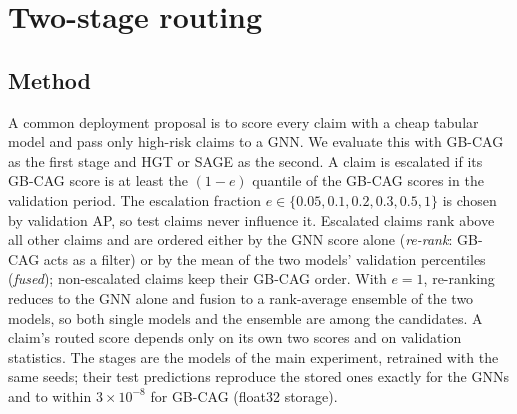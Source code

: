 \documentclass[pdflatex,sn-vancouver-num]{sn-jnl}
\begin{document}
\section{Two-stage routing}\label{sec:s_routing}

\subsection{Method}\label{sec:s_routing_method}
A common deployment proposal is to score every claim with a cheap tabular
model and pass only high-risk claims to a GNN. We evaluate this with GB-CAG
as the first stage and HGT or SAGE as the second. A claim is escalated if its
GB-CAG score is at least the $(1-e)$ quantile of the GB-CAG scores in the
validation period. The escalation fraction $e\in\{0.05, 0.1, 0.2, 0.3, 0.5,
1\}$ is chosen by validation AP, so test claims never influence it. Escalated
claims rank above all other claims and are ordered either by the GNN score
alone (\emph{re-rank}: GB-CAG acts as a filter) or by the mean of the two
models' validation percentiles (\emph{fused}); non-escalated claims keep
their GB-CAG order. With $e=1$, re-ranking reduces to the GNN alone and
fusion to a rank-average ensemble of the two models, so both single models
and the ensemble are among the candidates. A claim's routed score depends
only on its own two scores and on validation statistics. The stages are the
models of the main experiment, retrained with the same seeds; their test
predictions reproduce the stored ones exactly for the GNNs and to within
$3\times10^{-8}$ for GB-CAG (float32 storage).
\end{document}
